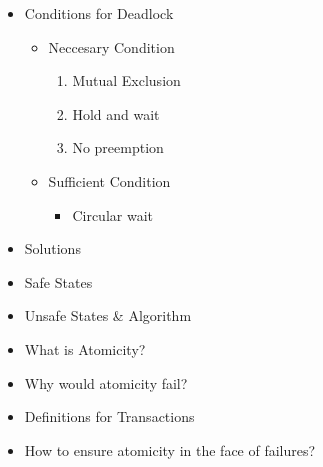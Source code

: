 \documentclass[12pt]{article}
\begin{document}
\begin{itemize}
    \item Conditions for Deadlock
    \begin{itemize}
        \item Neccesary Condition
        \begin{enumerate}[1.]
            \item Mutual Exclusion
            \item Hold and wait
            \item No preemption
        \end{enumerate}
        \item Sufficient Condition
        \begin{itemize}
            \item Circular wait
        \end{itemize}
    \end{itemize}
    \item Solutions
    \item Safe States
    \item Unsafe States \& Algorithm
    \item What is Atomicity?
    \item Why would atomicity fail?
    \item Definitions for Transactions
    \item How to ensure atomicity in the face of failures?

\end{itemize}
\end{document}
